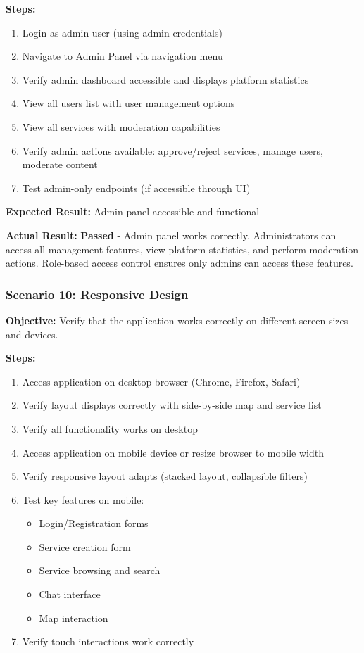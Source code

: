\documentclass[12pt,a4paper]{report}
\begin{document}
\textbf{Steps:}
\begin{enumerate}
    \item Login as admin user (using admin credentials)
    \item Navigate to Admin Panel via navigation menu
    \item Verify admin dashboard accessible and displays platform statistics
    \item View all users list with user management options
    \item View all services with moderation capabilities
    \item Verify admin actions available: approve/reject services, manage users, moderate content
    \item Test admin-only endpoints (if accessible through UI)
\end{enumerate}

\textbf{Expected Result:} Admin panel accessible and functional

\textbf{Actual Result:} \textbf{Passed} - Admin panel works correctly. Administrators can access all management features, view platform statistics, and perform moderation actions. Role-based access control ensures only admins can access these features.

\subsubsection{Scenario 10: Responsive Design}

\textbf{Objective:} Verify that the application works correctly on different screen sizes and devices.

\textbf{Steps:}
\begin{enumerate}
    \item Access application on desktop browser (Chrome, Firefox, Safari)
    \item Verify layout displays correctly with side-by-side map and service list
    \item Verify all functionality works on desktop
    \item Access application on mobile device or resize browser to mobile width
    \item Verify responsive layout adapts (stacked layout, collapsible filters)
    \item Test key features on mobile:
          \begin{itemize}
              \item Login/Registration forms
              \item Service creation form
              \item Service browsing and search
              \item Chat interface
              \item Map interaction
          \end{itemize}
    \item Verify touch interactions work correctly
\end{enumerate}
\end{document}
